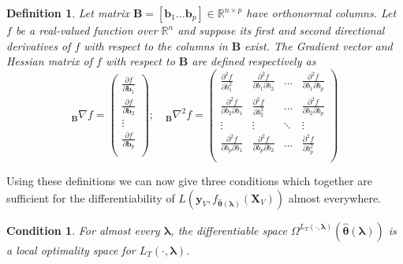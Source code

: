 \documentclass{statsoc}
\newtheorem{definition}{Definition}
\newtheorem{condition}{Condition}
\begin{document}
\begin{definition}
Let matrix $\boldsymbol B = [ \boldsymbol b_1 \hdots \boldsymbol b_p ] \in \mathbb{R}^{n \times p}$ have orthonormal columns. Let $f$ be a real-valued function over $\mathbb{R}^n$ and suppose its first and second directional derivatives of $f$ with respect to the columns in $\boldsymbol B$ exist. The Gradient vector and Hessian matrix of $f$ with respect to $\boldsymbol B$ are defined respectively as
\begin{equation}\label{eq:hess}
_{\boldsymbol B} \nabla f  =
\left (
\begin{array}{c}
\frac{\partial f}{\partial \boldsymbol b_1} \\
\frac{\partial f}{\partial \boldsymbol b_2} \\
\vdots\\
\frac{\partial f}{\partial \boldsymbol b_p}\\
\end{array}
\right );
\quad
_{\boldsymbol B}\nabla^2 f =
\left (
\begin{array}{cccc}
\frac{\partial^2 f}{\partial b_1^2} & \frac{\partial^2 f}{\partial b_1 \partial b_2} & ...  & \frac{\partial^2 f}{\partial b_1 \partial b_p} \\
\frac{\partial^2 f}{\partial b_2 \partial b_1} & \frac{\partial^2 f}{\partial b_2^2} & ...  & \frac{\partial^2 f}{\partial b_2 \partial b_p} \\
\vdots & \vdots &  \ddots & \vdots \\
\frac{\partial^2 f}{\partial b_p \partial b_1} & \frac{\partial^2 f}{\partial b_p \partial b_2} & ...  & \frac{\partial^2 f}{\partial b_p^2} \\
\end{array}
\right )
\end{equation}
\end{definition}

Using these definitions we can now give three conditions which together are sufficient for the differentiability of $L \left( \boldsymbol{y}_V, f_{\hat{\boldsymbol \theta}(\boldsymbol{\lambda})}(\boldsymbol{X}_V) \right )$ almost everywhere.

\begin{condition}
For almost every $\boldsymbol{\lambda}$, the differentiable space $\Omega^{L_T(\cdot, \boldsymbol{\lambda})}(\hat{\boldsymbol \theta}\left(\boldsymbol{\lambda}\right))$ is a local optimality space for $L_T\left(\cdot,\boldsymbol{\lambda}\right)$.
\end{condition}
\end{document}
